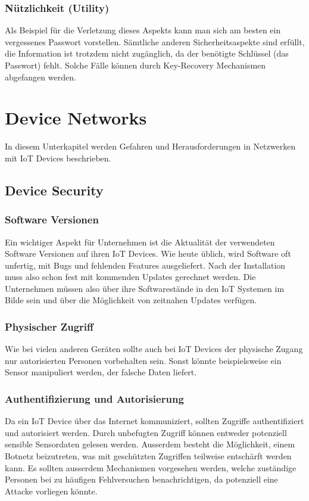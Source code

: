 \subsubsection{Nützlichkeit (Utility)}
Als Beispiel für die Verletzung dieses Aspekts kann man sich am besten ein vergessenes Passwort vorstellen. Sämtliche anderen Sicherheitsaspekte sind erfüllt, die Information ist trotzdem nicht zugänglich, da der benötigte Schlüssel (das Passwort) fehlt. Solche Fälle können durch Key-Recovery Mechanismen abgefangen werden. \cite{ParkerianHexadWiki}
\section{Device Networks}
In diesem Unterkapitel werden Gefahren und Herausforderungen in Netzwerken mit IoT Devices beschrieben.
\subsection{Device Security}
\subsubsection{Software Versionen}
Ein wichtiger Aspekt für Unternehmen ist die Aktualität der verwendeten Software Versionen auf ihren IoT Devices. Wie heute üblich, wird Software oft unfertig, mit Bugs und fehlenden Features ausgeliefert. Nach der Installation muss also schon fest mit kommenden Updates gerechnet werden. Die Unternehmen müssen also über ihre Softwarestände in den IoT Systemen im Bilde sein und über die Möglichkeit von zeitnahen Updates verfügen. 

\subsubsection{Physischer Zugriff}
Wie bei vielen anderen Geräten sollte auch bei IoT Devices der physische Zugang nur autorisierten Personen vorbehalten sein. Sonst könnte beispielsweise ein Sensor manipuliert werden, der falsche Daten liefert.

\subsubsection{Authentifizierung und Autorisierung}
Da ein IoT Device über das Internet kommuniziert, sollten Zugriffe authentifiziert und autorisiert werden. Durch unbefugten Zugriff können entweder potenziell sensible Sensordaten gelesen werden. Ausserdem besteht die Möglichkeit, einem Botnetz beizutreten, was mit geschützten Zugriffen teilweise entschärft werden kann. Es sollten ausserdem Mechanismen vorgesehen werden, welche zuständige Personen bei zu häufigen Fehlversuchen benachrichtigen, da potenziell eine Attacke vorliegen könnte.
 \newpage
